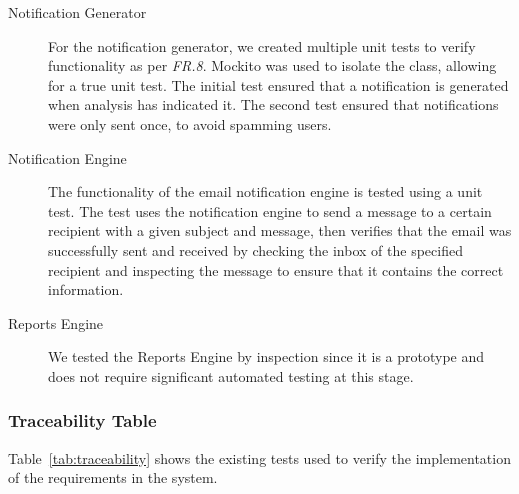 \documentclass[10pt,a4paper]{article}
\newcommand{\frit}[1]{\textit{FR.#1}}
\begin{document}
\begin{description}
  \item[Notification Generator] For the notification generator, we created 
	multiple unit tests to verify functionality as per \frit{8}. Mockito was 
	used to isolate the class, allowing for a true unit test. The initial 
	test ensured that a notification is generated when analysis has indicated 
	it. The second test ensured that notifications were only sent once, to 
	avoid spamming users.	 
  
  \item[Notification Engine] The functionality of the email notification 
	engine is tested using a unit test. The test uses the notification engine 
	to send a message to a certain recipient with a given subject and message, 
	then verifies that the email was successfully sent and received by checking 
	the inbox of the specified recipient and inspecting the message to ensure 
	that it contains the correct information.

  \item[Reports Engine] We tested the Reports Engine by inspection since it 
	is a prototype and does not require significant automated testing at this 
	stage.

 \end{description}

\subsubsection{Traceability Table}

Table~\ref{tab:traceability} shows the existing tests used to verify the implementation of the requirements in the system.
\end{document}
